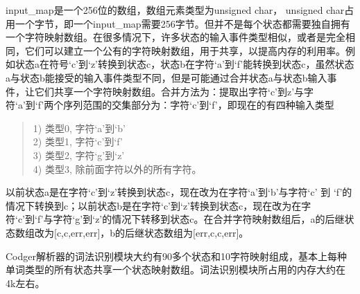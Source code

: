 input\_map是一个256位的数组，数组元素类型为unsigned char， unsigned char占用一个字节，即一个input\_map需要256字节。但并不是每个状态都需要独自拥有一个字符映射数组。在很多情况下，许多状态的输入事件类型相似，或者是完全相同，它们可以建立一个公有的字符映射数组，用于共享，以提高内存的利用率。例如状态a在符号`c'到`z'转换到状态c，状态b在字符`a'到`f'能转换到状态c，虽然状态a与状态b能接受的输入事件类型不同，但是可能通过合并状态a与状态b输入事件，让它们共享一个字符映射数组。合并方法为：提取出字符`c'到z'与字符`a'到`f'两个序列范围的交集部分为：字符`c'到`f'，即现在的有四种输入类型
\begin{quote}
1) 类型0, 字符`a'到`b' \\
2) 类型1, 字符`c'到`f' \\
3) 类型2, 字符`g'到`z' \\
4) 类型3, 除前面字符以外的所有字符。 
\end{quote}
以前状态a是在字符`c'到`z'转换到状态c，现在改为在字符`a'到`b'与字符`c' 到 `f'的情况下转换到c；以前状态b是在字符`c'到`z'转换到状态c，现在改为在字符`c'到`f'与字符`g'到`z'的情况下转移到状态c。在合并字符映射数组后，a的后继状态数组改为[c,c,err,err]，b的后继状态数组为[err,c,c,err]。

Codger解析器的词法识别模块大约有90多个状态和10字符映射组成，基本上每种单词类型的所有状态共享一个状态映射数组。词法识别模块所占用的内存大约在4k左右。
